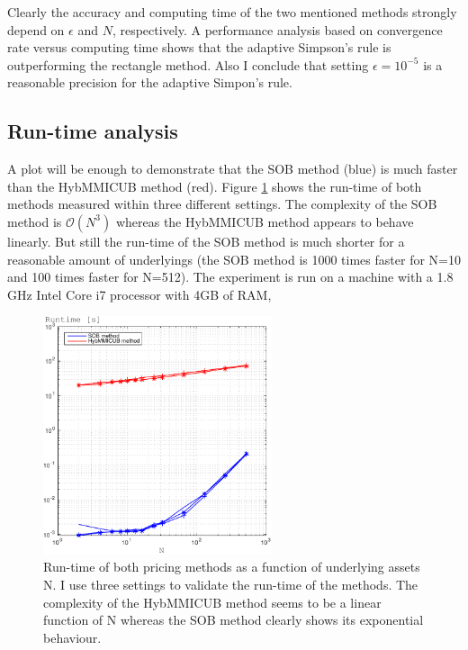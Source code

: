 \documentclass[a4paper]{article}
\begin{document}
Clearly the accuracy and computing time of the two mentioned methods strongly depend on $\epsilon$ and $N$, respectively. A performance analysis based on convergence rate versus computing time shows that the adaptive Simpson's rule is outperforming the rectangle method. Also I conclude that setting $\epsilon = 10^{-5}$ is  a reasonable precision for the adaptive Simpon's rule.
\subsection{Run-time analysis}
\label{rt}
A plot will be enough to demonstrate that the SOB method (blue) is much faster than the HybMMICUB method (red). Figure \ref{fig:rt} shows the run-time of both methods measured within three different settings. The complexity of the SOB method is $\mathcal{O}(N^3)$ whereas the HybMMICUB method appears to behave linearly. But still the run-time of the SOB method is much shorter for a reasonable amount of underlyings (the SOB method is 1000 times faster for N=10 and 100 times faster for N=512). The experiment is run on a machine with a 1.8 GHz Intel Core i7 processor with 4GB of RAM,
\begin{figure}[h!]
	\centering
	\captionsetup{width=.6\linewidth}
	\includegraphics[width=0.6\textwidth]{graphics/runtime.pdf}
	\caption{Run-time of both pricing methods as a function of underlying assets N. I use three settings to validate the run-time of the methods. The complexity of 		the HybMMICUB method seems to be a linear function of N whereas the SOB method clearly shows its exponential behaviour.}
	\label{fig:rt}
\end{figure}
\end{document}
